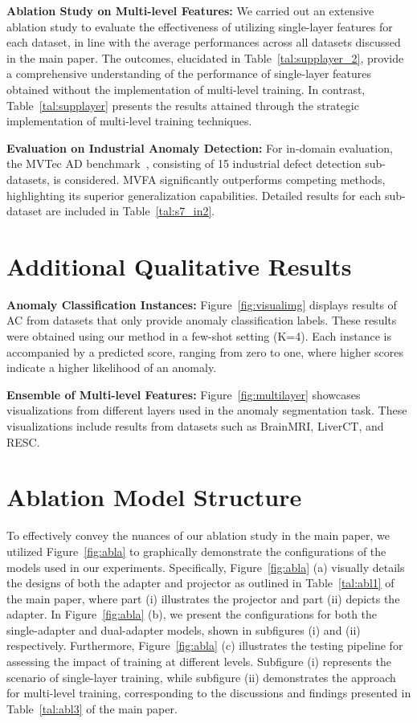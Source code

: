 \noindent \textbf{Ablation Study on Multi-level Features:} 
We carried out an extensive ablation study to evaluate the effectiveness of utilizing single-layer features for each dataset, in line with the average performances across all datasets discussed in the main paper. The outcomes, elucidated in Table~\ref{tal:supplayer_2}, provide a comprehensive understanding of the performance of single-layer features obtained without the implementation of multi-level training. In contrast, Table~\ref{tal:supplayer} presents the results attained through the strategic implementation of multi-level training techniques.

\noindent \textbf{Evaluation on Industrial Anomaly Detection:} For in-domain evaluation, the MVTec AD benchmark~\cite{bergmann2019mvtec}, consisting of 15 industrial defect detection sub-datasets, is considered. MVFA significantly outperforms competing methods, highlighting its superior generalization capabilities. Detailed results for each sub-dataset are included in Table~\ref{tal:s7_in2}.

\section{Additional Qualitative Results}\label{sec:ap_vis}

\noindent \textbf{Anomaly Classification Instances:} Figure~\ref{fig:visualimg} displays results of AC from datasets that only provide anomaly classification labels. These results were obtained using our method in a few-shot setting (K=4). Each instance is accompanied by a predicted score, ranging from zero to one, where higher scores indicate a higher likelihood of an anomaly.

\noindent \textbf{Ensemble of Multi-level Features:} 
Figure~\ref{fig:multilayer} showcases visualizations from different layers used in the anomaly segmentation task. These visualizations include results from datasets such as BrainMRI, LiverCT, and RESC.

\section{Ablation Model Structure}

To effectively convey the nuances of our ablation study in the main paper, we utilized Figure~\ref{fig:abla} to graphically demonstrate the configurations of the models used in our experiments. Specifically, Figure~\ref{fig:abla} (a) visually details the designs of both the adapter and projector as outlined in Table~\ref{tal:abl1} of the main paper, where part (i) illustrates the projector and part (ii) depicts the adapter. In Figure~\ref{fig:abla} (b), we present the configurations for both the single-adapter and dual-adapter models, shown in subfigures (i) and (ii) respectively. Furthermore, Figure~\ref{fig:abla} (c) illustrates the testing pipeline for assessing the impact of training at different levels. Subfigure (i) represents the scenario of single-layer training, while subfigure (ii) demonstrates the approach for multi-level training, corresponding to the discussions and findings presented in Table~\ref{tal:abl3} of the main paper.

